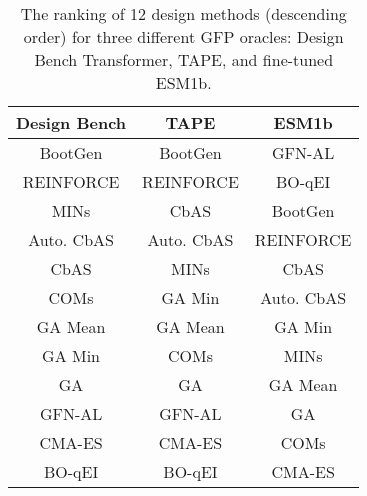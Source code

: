 \begin{table}[t!]
    \centering
    \caption{The ranking of 12 design methods (descending order) for three different GFP oracles: Design Bench Transformer, TAPE, and fine-tuned ESM1b.}
    \vspace{1ex}
    \label{tab:gfp_oracles}
    \begin{adjustbox}{width=0.6\linewidth,center}
    \begin{tabular}{|c|c|c|}
\toprule
\textbf{Design Bench}                                           & \textbf{TAPE}                                          & \textbf{ESM1b}                                                \\ \midrule
\cellcolor[HTML]{E6B8AF}BootGen & \cellcolor[HTML]{E6B8AF}BootGen & \cellcolor[HTML]{F8E3A6}GFN-AL  \\ 
\cellcolor[HTML]{FFF2CC}REINFORCE & \cellcolor[HTML]{FFF2CC}REINFORCE & \cellcolor[HTML]{B5DDCA}BO-qEI \\ 
\cellcolor[HTML]{D0E0E3}MINs & \cellcolor[HTML]{FCE5CD}CbAS & \cellcolor[HTML]{E6B8AF}BootGen \\ 
\cellcolor[HTML]{D9EAD3}Auto. CbAS & \cellcolor[HTML]{D9EAD3}Auto. CbAS & \cellcolor[HTML]{FFF2CC}REINFORCE \\ 
\cellcolor[HTML]{FCE5CD}CbAS & \cellcolor[HTML]{D0E0E3}MINs & \cellcolor[HTML]{FCE5CD}CbAS \\ 
\cellcolor[HTML]{C9DAF8}COMs  & \cellcolor[HTML]{CFE2F3}GA Min & \cellcolor[HTML]{D9EAD3}Auto. CbAS \\ 
\cellcolor[HTML]{F4CCCC}GA Mean  & \cellcolor[HTML]{F4CCCC}GA Mean  & \cellcolor[HTML]{CFE2F3}GA Min \\ 
\cellcolor[HTML]{CFE2F3}GA Min & \cellcolor[HTML]{C9DAF8}COMs  & \cellcolor[HTML]{D0E0E3}MINs \\ 
\cellcolor[HTML]{D9D2E9}GA & \cellcolor[HTML]{D9D2E9}GA & \cellcolor[HTML]{F4CCCC}GA Mean  \\ 
\cellcolor[HTML]{F8E3A6}GFN-AL  & \cellcolor[HTML]{F8E3A6}GFN-AL  & \cellcolor[HTML]{D9D2E9}GA \\ 
\cellcolor[HTML]{EAD1DC}CMA-ES & \cellcolor[HTML]{EAD1DC}CMA-ES & \cellcolor[HTML]{C9DAF8}COMs  \\ 
\cellcolor[HTML]{B5DDCA}BO-qEI & \cellcolor[HTML]{B5DDCA}BO-qEI & \cellcolor[HTML]{EAD1DC}CMA-ES \\ 

  \bottomrule
\end{tabular}
\end{adjustbox}
\vspace{-2ex}
\end{table}
